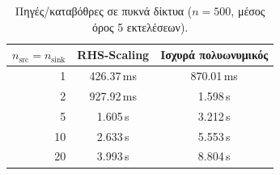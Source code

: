 \begin{table}[h]
\centering
\caption{Πηγές/καταβόθρες σε πυκνά δίκτυα ($n = 500$, μέσος όρος 5 εκτελέσεων).}
\label{tab:sources-dense}
\begin{tabular}{rcc}
\toprule
$n_{\text{src}} = n_{\text{sink}}$ & \textenglish{RHS-Scaling} & Ισχυρά πολυωνυμικός \\
\midrule
  1 & 426.37\,ms & 870.01\,ms \\
  2 & 927.92\,ms & 1.598\,s \\
  5 & 1.605\,s & 3.212\,s \\
  10 & 2.633\,s & 5.553\,s \\
  20 & 3.993\,s & 8.804\,s \\
\bottomrule
\end{tabular}
\end{table}
